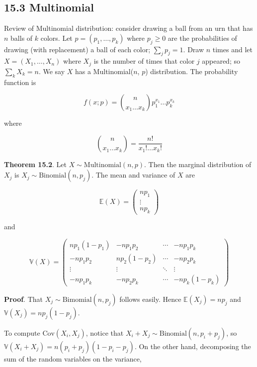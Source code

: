 \subsection*{15.3 Multinomial}\label{multinomial}

Review of Multinomial distribution: consider drawing a ball from an urn
that has \(n\) balls of \(k\) colors. Let \(p = (p_{1}, \dots, p_{k})\)
where \(p_{j} \geq 0\) are the probabilities of drawing (with replacement)
a ball of each color; \(\sum_{j} p_{j} = 1\). Draw \(n\) times and let
\(X = (X_{1}, \dots, X_{n})\) where \(X_{j}\) is the number of times that
color \(j\) appeared; so \(\sum_{k} X_{k} = n\). We say \(X\) has a
Multinomial(\(n\), \(p\)) distribution. The probability function is

\[ f(x; p) = \binom{n}{x_{1} \dots x_{k}} p_{1}^{x_{1}}\dots p_{k}^{x_{k}}\]

where

\[ \binom{n}{x_{1} \dots x_{k}} = \frac{n!}{x_{1}! \dots x_{k}!} \]

\textbf{Theorem 15.2}. Let \(X \sim \text{Multinomial}(n, p)\). Then the
marginal distribution of \(X_{j}\) is
\(X_{j} \sim \text{Binomial}(n, p_{j})\). The mean and variance of \(X\) are

\[\mathbb{E}(X) = \begin{pmatrix} np_{1} \\ \vdots \\ np_{k} \end{pmatrix}\]

and

\[\mathbb{V}(X) = \begin{pmatrix}
np_{1}(1 - p_{1}) & -np_{1}p_{2} & \cdots & -np_{1}p_{k} \\
-np_{1}p_{2} & np_{2}(1 - p_{2}) & \cdots & -np_{2}p_{k} \\
\vdots & \vdots & \ddots & \vdots \\
-np_{1}p_{k} & -np_{2}p_{k} & \cdots & -np_{k}(1 - p_{k})
\end{pmatrix}\]

\textbf{Proof}. That \(X_{j} \sim \text{Bimomial}(n, p_{j})\) follows
easily. Hence \(\mathbb{E}(X_{j}) = np_{j}\) and
\(\mathbb{V}(X_{j}) = np_{j}(1 - p_{j})\).

To compute \(\text{Cov}(X_{i}, X_{j})\), notice that
\(X_{i} + X_{j} \sim \text{Binomial}(n, p_{i} + p_{j})\), so
\(\mathbb{V}(X_{i} + X_{j}) = n (p_{i} + p_{j}) (1 - p_{i} - p_{j})\). On the other
hand, decomposing the sum of the random variables on the variance,

